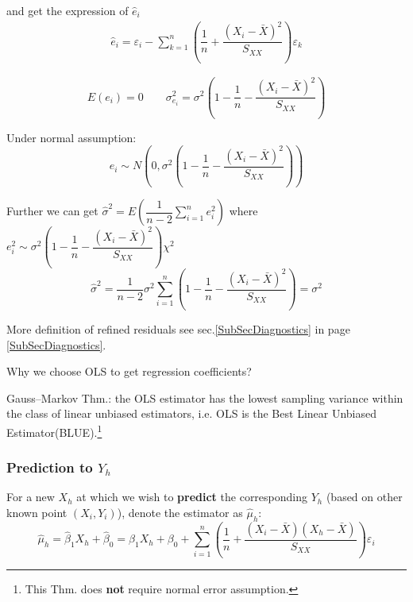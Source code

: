     and get the expression of $ \hat{e}_i $
    \begin{equation}
        \begin{aligned}
            \hat{e}_i=\varepsilon _i-\sum_{k=1}^n\left( \dfrac{1}{n}+\dfrac{(X_i-\bar{X})^2}{S_{XX}} \right)\varepsilon _k
        \end{aligned}
    \end{equation}
    
    
    \begin{equation}
        E(e_i)=0\qquad \sigma ^2_{e_i}=\sigma ^2 \left( 1-\dfrac{1}{n}-\dfrac{(X_i-\bar{X})^2}{S_{XX}} \right)
    \end{equation}

    Under normal assumption:
    \begin{equation}\label{EqaSamplingDistributionOfResiduals}
        e_i\sim N(0,\sigma ^2\left( 1-\dfrac{1}{n}-\dfrac{(X_i-\bar{X})^2}{S_{XX}} \right) ) 
    \end{equation}
    

    Further we can get $ \hat{\sigma }^2=E(\dfrac{1}{n-2}\sum_{i=1}^ne_i^2) $ where $ e_i^2\sim \sigma ^2\left( 1-\dfrac{1}{n}-\dfrac{(X_i-\bar{X})^2}{S_{XX}} \right)\chi^2 $
    \begin{equation}
        \hat{\sigma }^2=\dfrac{1}{n-2}\sigma ^2\sum_{i=1}^n(1-\dfrac{1}{n}-\dfrac{(X_i-\bar{X})^2}{S_{XX}})=\sigma ^2
    \end{equation}
    
    More definition of refined residuals see sec.\ref{SubSecDiagnostics} in page \ref{SubSecDiagnostics}.
    


\begin{point}
    Why we choose OLS to get regression coefficients?


    Gauss–Markov Thm.: the OLS estimator has the lowest sampling variance within the class of linear unbiased estimators, i.e. OLS is the Best Linear Unbiased Estimator(BLUE).\footnote{This Thm. does \textbf{not }require normal error assumption.}
\end{point}
    



\subsubsection{Prediction to $ Y_h $}
    For a new $ X_h $ at which we wish to \textbf{predict }the corresponding $ Y_h $ (based on other known point $ (X_i,Y_i) $), denote the estimator as $ \hat{\mu}_h $:
    \begin{equation}
        \hat{\mu}_h=\hat{\beta}_1X_h+\hat{\beta}_0 =\beta_1X_h+\beta _0+\sum_{i=1}^n\left( \dfrac{1}{n}+\dfrac{(X_i-\bar{X})(X_h-\bar{X})}{S_{XX}} \right)\varepsilon _i
    \end{equation}
    
